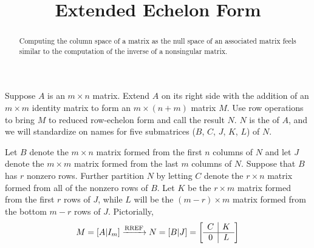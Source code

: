 \documentclass{ximera}
\title{Extended Echelon Form}
\begin{document}
\begin{abstract}
  Computing the column space of a matrix as the null space of an
  associated matrix feels similar to the computation of the inverse of
  a nonsingular matrix.
\end{abstract}
\maketitle

\begin{definition}
  Suppose $A$ is an $m\times n$ matrix.  Extend $A$ on its right side
  with the addition of an $m\times m$ identity matrix to form an
  $m\times (n + m)$ matrix $M$.  Use row operations to bring $M$ to
  reduced row-echelon form and call the result $N$.  $N$ is the
   of $A$, and we will
  standardize on names for five submatrices ($B$, $C$, $J$, $K$, $L$)
  of $N$.

  Let $B$ denote the $m\times n$ matrix formed from the first $n$
  columns of $N$ and let $J$ denote the $m\times m$ matrix formed from
  the last $m$ columns of $N$.  Suppose that $B$ has $r$ nonzero rows.
  Further partition $N$ by letting $C$ denote the $r\times n$ matrix
  formed from all of the nonzero rows of $B$.  Let $K$ be the
  $r\times m$ matrix formed from the first $r$ rows of $J$, while $L$
  will be the $(m-r)\times m$ matrix formed from the bottom $m-r$ rows
  of $J$.  Pictorially,
  \[
    M=[A\vert I_m]
    \xrightarrow{\text{RREF}}
    N=[B\vert J]
    =
    \left[\begin{array}{c|c}C&K\\\hline0&L\end{array}\right]
  \]
\end{definition}
\end{document}
